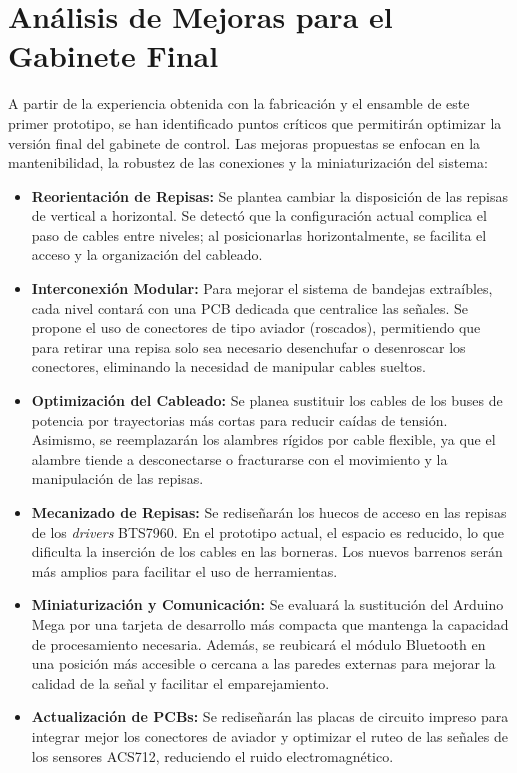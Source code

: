 \section{Análisis de Mejoras para el Gabinete Final}

A partir de la experiencia obtenida con la fabricación y el ensamble de este primer prototipo, se han identificado puntos críticos que permitirán optimizar la versión final del gabinete de control. Las mejoras propuestas se enfocan en la mantenibilidad, la robustez de las conexiones y la miniaturización del sistema:

\begin{itemize}
	\item \textbf{Reorientación de Repisas:} Se plantea cambiar la disposición de las repisas de vertical a horizontal. Se detectó que la configuración actual complica el paso de cables entre niveles; al posicionarlas horizontalmente, se facilita el acceso y la organización del cableado.
	\item \textbf{Interconexión Modular:} Para mejorar el sistema de bandejas extraíbles, cada nivel contará con una PCB dedicada que centralice las señales. Se propone el uso de conectores de tipo aviador (roscados), permitiendo que para retirar una repisa solo sea necesario desenchufar o desenroscar los conectores, eliminando la necesidad de manipular cables sueltos.
	\item \textbf{Optimización del Cableado:} Se planea sustituir los cables de los buses de potencia por trayectorias más cortas para reducir caídas de tensión. Asimismo, se reemplazarán los alambres rígidos por cable flexible, ya que el alambre tiende a desconectarse o fracturarse con el movimiento y la manipulación de las repisas.
	\item \textbf{Mecanizado de Repisas:} Se rediseñarán los huecos de acceso en las repisas de los \textit{drivers} BTS7960. En el prototipo actual, el espacio es reducido, lo que dificulta la inserción de los cables en las borneras. Los nuevos barrenos serán más amplios para facilitar el uso de herramientas.
	\item \textbf{Miniaturización y Comunicación:} Se evaluará la sustitución del Arduino Mega por una tarjeta de desarrollo más compacta que mantenga la capacidad de procesamiento necesaria. Además, se reubicará el módulo Bluetooth en una posición más accesible o cercana a las paredes externas para mejorar la calidad de la señal y facilitar el emparejamiento.
	\item \textbf{Actualización de PCBs:} Se rediseñarán las placas de circuito impreso para integrar mejor los conectores de aviador y optimizar el ruteo de las señales de los sensores ACS712, reduciendo el ruido electromagnético.
\end{itemize}

